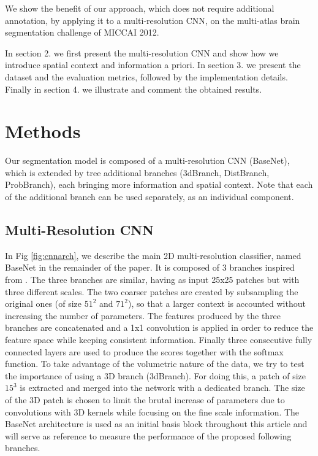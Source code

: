 \documentclass{article}
\begin{document}
We show the benefit of our approach, which does not require additional annotation, by applying it to a multi-resolution CNN, on the multi-atlas brain segmentation challenge of MICCAI 2012.

In section 2. we first present the multi-resolution CNN and show how we introduce spatial context and information a priori. In section 3. we present the dataset and the evaluation metrics, followed by the implementation details. Finally in section 4. we illustrate and comment the obtained results.

\section{Methods}
Our segmentation model is composed of a multi-resolution CNN (BaseNet), which is extended by tree additional branches (3dBranch, DistBranch, ProbBranch), each bringing more information and spatial context.
Note that each of the additional branch can be used separately, as an individual component.

\subsection{Multi-Resolution CNN}
In Fig \ref{fig:cnnarch}, we describe the main 2D multi-resolution classifier, named BaseNet in the remainder of the paper. It is composed of 3 branches inspired from \cite{moeskops_automatic_2016, brebisson}.
The three branches are similar, having as input 25x25 patches but with three different scales. The two coarser patches are created by subsampling the original ones (of size $51^2$ and $71^2$), so that a larger context is accounted without increasing the number of parameters.
The features produced by the three branches are concatenated and a 1x1 convolution is applied in order to reduce the feature space while keeping consistent information. Finally three consecutive fully connected layers are used to produce the scores together with the softmax function. To take advantage of the volumetric nature of the data, we try to test the importance of using a 3D branch (3dBranch). For doing this, a patch of size $15^3$ is extracted and merged into the network with a dedicated branch.
The size of the 3D patch is chosen to limit the brutal increase of parameters due to convolutions with 3D kernels while focusing on the fine scale information. \newline
The BaseNet architecture is used as an initial basis block throughout this article and will serve as reference to measure the performance of the proposed following branches.
\end{document}
